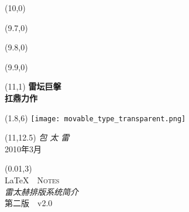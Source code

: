 \begin{titlepage}

\setlength\parindent{0pt}


\begin{textblock}{6}(10,0)
    \rule{0mm}{420mm}
\end{textblock}

\begin{textblock}{.02}(9.7,0)
    \rule{0mm}{420mm}
\end{textblock}

\begin{textblock}{.02}(9.8,0)
    \rule{0mm}{420mm}
\end{textblock}

\begin{textblock}{.02}(9.9,0)
    \rule{0mm}{420mm}
\end{textblock}

\begin{textblock}{3}(11,1)
    {\Huge \textbf{雷坛巨搫}\\[5pt] \textbf{扛鼎力作}}
\end{textblock}

\begin{textblock}{12}(1.8,6)
\textblockcolour{}
    \texttt{[image: movable\_type\_transparent.png]}
\end{textblock}

\begin{textblock}{4}(11,12.5)
    {\huge \textit{包 太 雷}}\\[5pt]
    {\Large 2010年3月}
\end{textblock}

\TPshowboxestrue
\setlength\TPboxrulesize{0.8pt}

\begin{textblock}{14}(0.01,3)
    \centering
    ~\\[20pt]
    {\fontsize{32}{40}\selectfont \LaTeX\ \ \textsc{Notes}}\\[8pt]
    {\huge \textit{雷太赫排版系统简介}}\\[8pt]
    第二版\ \ v2.0\\[20pt]
\end{textblock}
~
\end{titlepage}

\newpage
\thispagestyle{empty}
~

